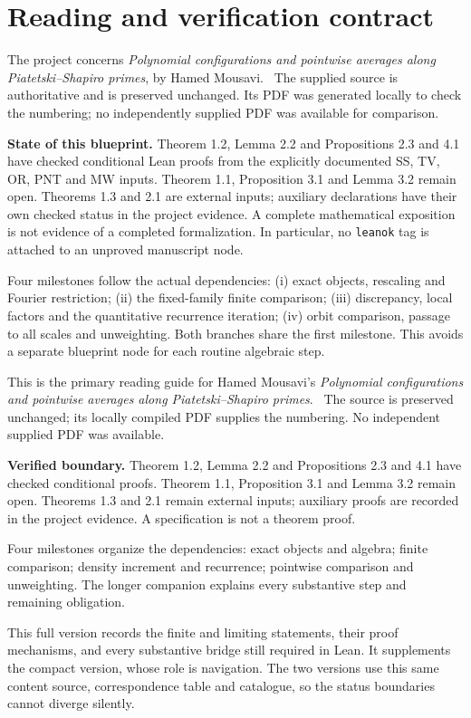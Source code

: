 \section*{Reading and verification contract}
\ifDetailed
The project concerns \emph{Polynomial configurations and pointwise averages along Piatetski--Shapiro primes}, by Hamed Mousavi. \versionnote\ The supplied source is authoritative and is preserved unchanged. Its PDF was generated locally to check the numbering; no independently supplied PDF was available for comparison.

\textbf{State of this blueprint.} Theorem 1.2, Lemma 2.2 and Propositions 2.3 and 4.1 have checked conditional Lean proofs from the explicitly documented SS, TV, OR, PNT and MW inputs. Theorem 1.1, Proposition 3.1 and Lemma 3.2 remain open. Theorems 1.3 and 2.1 are external inputs; auxiliary declarations have their own checked status in the project evidence. A complete mathematical exposition is not evidence of a completed formalization. In particular, no \texttt{leanok} tag is attached to an unproved manuscript node.

Four milestones follow the actual dependencies: (i) exact objects, rescaling and Fourier restriction; (ii) the fixed-family finite comparison; (iii) discrepancy, local factors and the quantitative recurrence iteration; (iv) orbit comparison, passage to all scales and unweighting. Both branches share the first milestone. This avoids a separate blueprint node for each routine algebraic step.

\else
This is the primary reading guide for Hamed Mousavi's \emph{Polynomial configurations and pointwise averages along Piatetski--Shapiro primes}. \versionnote\ The source is preserved unchanged; its locally compiled PDF supplies the numbering. No independent supplied PDF was available.

\textbf{Verified boundary.} Theorem 1.2, Lemma 2.2 and Propositions 2.3 and 4.1 have checked conditional proofs. Theorem 1.1, Proposition 3.1 and Lemma 3.2 remain open. Theorems 1.3 and 2.1 remain external inputs; auxiliary proofs are recorded in the project evidence. A specification is not a theorem proof.

Four milestones organize the dependencies: exact objects and algebra; finite comparison; density increment and recurrence; pointwise comparison and unweighting. The longer companion explains every substantive step and remaining obligation.
\fi

\ifDetailed
This full version records the finite and limiting statements, their proof mechanisms, and every substantive bridge still required in Lean. It supplements the compact version, whose role is navigation. The two versions use this same content source, correspondence table and catalogue, so the status boundaries cannot diverge silently.

